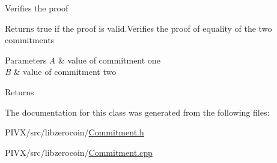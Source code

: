 Verifies the proof

\begin{DoxyReturn}{Returns}
true if the proof is valid.\+Verifies the proof of equality of the two commitments
\end{DoxyReturn}

\begin{DoxyParams}{Parameters}
{\em A} & value of commitment one \\
\hline
{\em B} & value of commitment two \\
\hline
\end{DoxyParams}
\begin{DoxyReturn}{Returns}

\end{DoxyReturn}


The documentation for this class was generated from the following files\+:\begin{DoxyCompactItemize}
\item 
P\+I\+V\+X/src/libzerocoin/\mbox{\hyperlink{_commitment_8h}{Commitment.\+h}}\item 
P\+I\+V\+X/src/libzerocoin/\mbox{\hyperlink{_commitment_8cpp}{Commitment.\+cpp}}\end{DoxyCompactItemize}
